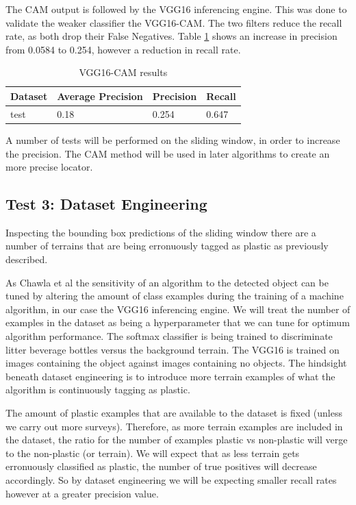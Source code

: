 \documentclass{IEEEtran}
\begin{document}
The CAM output is followed by the VGG16 inferencing engine. This was done to validate the weaker classifier the VGG16-CAM. The two filters reduce the recall rate, as both drop their False Negatives. Table \ref{tablecam} shows an increase in precision from 0.0584 to 0.254, however a reduction in recall rate.\newline

\begin{table}[ht]
\caption{VGG16-CAM results}
\label{tablecam}
\centering
\begin{tabular}{llll} 
\hline
\textbf{Dataset} & \textbf{Average Precision} & \textbf{Precision} & \textbf{Recall}  \\ 
\hline
test             & 0.18                       & 0.254              & 0.647            \\
\end{tabular}
\end{table}



A number of tests will be performed on the sliding window, in order to increase the precision. The CAM method will be used in later algorithms to create an more precise locator.

\subsection{Test 3: Dataset Engineering}

Inspecting the bounding box predictions of the sliding window there are a number of terrains that are being erronuously tagged as plastic as previously described. \newline

As Chawla et al \cite{Chawla2002} the sensitivity of an algorithm to the detected object can be tuned by altering the amount of class examples during the training of a machine algorithm, in our case the VGG16 inferencing engine. We will treat the number of examples in the dataset as being a hyperparameter that we can tune for optimum algorithm performance. The softmax classifier is being trained to discriminate litter beverage bottles versus the background terrain. The VGG16 is trained on images containing the object against images containing no objects. The hindsight beneath dataset engineering is to introduce more terrain examples of what the algorithm is continuously tagging as plastic.\newline

The amount of plastic examples that are available to the dataset is fixed (unless we carry out more surveys). Therefore, as more terrain examples are included in the dataset, the ratio for the number of examples plastic vs non-plastic will verge to the non-plastic (or terrain). We will expect that as less terrain gets erronuously classified as plastic, the number of true positives will decrease accordingly. So by dataset engineering we will be expecting smaller recall rates however at a greater precision value.\newline
\end{document}
